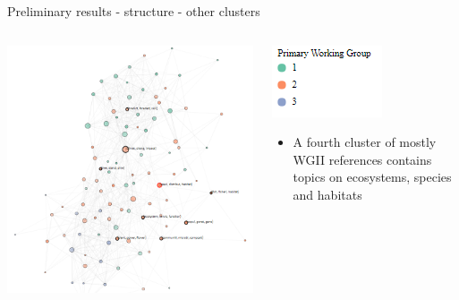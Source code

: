 \documentclass[9pt]{beamer}
\begin{document}
\begin{frame}{Preliminary results - structure - other clusters}

\begin{columns}
	\begin{column}{0.65\linewidth}
		\begin{center}
			\vspace*{-0.1\linewidth}
			\hspace*{-0.1\linewidth}
			\includegraphics[width=1.25\linewidth]{../plots/network_wg_372_4.PNG}
		\end{center}
	\end{column}
	\begin{column}{0.35\linewidth}
		\includegraphics[width=0.4\linewidth]{../plots/network_wg_key.PNG}
		\begin{center}
			\begin{itemize}
				\item A fourth cluster of mostly WGII references contains topics on ecosystems, species and habitats
			\end{itemize}
		\end{center}
	\end{column}
\end{columns}

\end{frame}
\end{document}
